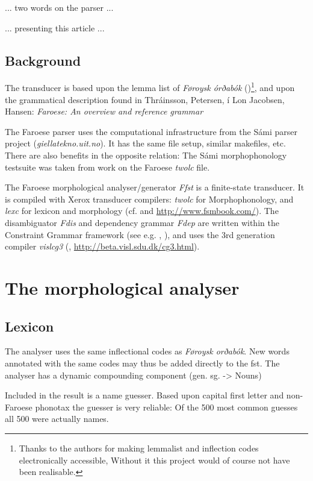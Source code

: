 \documentclass{article}
\begin{document}
... two words on the parser ...

... presenting this article ...

\subsection{Background}

The transducer is based upon the lemma list of \emph{Føroysk órðabók} (\cite{Poulsen98})\footnote{Thanks to the authors for making lemmalist and inflection codes electronically accessible, Without it this project would of course not have been realisable.}, and upon the grammatical description found in Thráinsson, Petersen, í Lon Jacobsen, Hansen: \textit{Faroese: An overview and reference grammar} 

The Faroese parser uses the computational infrastructure from the Sámi parser project (\textit{giellatekno.uit.no}). It has the same file setup, similar makefiles, etc. There are also benefits in the opposite relation: The Sámi morphophonology testsuite was taken from work on the Faroese \textit{twolc} file. 

The Faroese morphological analyser/generator \textit{Ffst} is a finite-state transducer. It is compiled with Xerox transducer compilers: \textit{twolc} for Morphophonology, and \textit{lexc} for lexicon and morphology (cf. \cite{Beesley03} and \url{http://www.fsmbook.com/}). The disambiguator \textit{Fdis} and dependency grammar \textit{Fdep} are written within the Constraint Grammar framework (see e.g. \cite{Karlsson90}, \cite{Karlsson95}), and uses the 3rd generation compiler \textit{vislcg3} (\cite{Bick00}, \url{http://beta.visl.sdu.dk/cg3.html}).


\section{The morphological analyser}




\subsection{Lexicon}

The analyser uses the same inflectional codes as  \textit{Føroysk orðabók}.  New words annotated with the same codes may thus be added directly to the fst. The analyser has a dynamic compounding component (gen. sg. -> Nouns)

Included in the result is a name guesser. Based upon capital first letter and non-Faroese phonotax the guesser is very reliable: Of the 500 most common guesses all 500 were actually names. 
\end{document}
